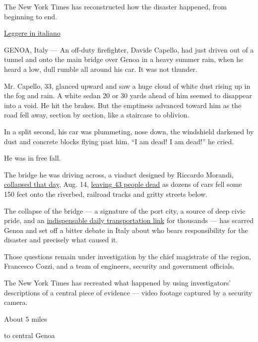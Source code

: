 The New York Times has reconstructed how the disaster happened, from
beginning to end.

\href{https://www.nytimes3xbfgragh.onion/interactive/2018/09/08/world/europe/genoa-italy-bridge-italian.html}{Leggere
in italiano}

GENOA, Italy --- An off-duty firefighter, Davide Capello, had just
driven out of a tunnel and onto the main bridge over Genoa in a heavy
summer rain, when he heard a low, dull rumble all around his car. It was
not thunder.

Mr. Capello, 33, glanced upward and saw a huge cloud of white dust
rising up in the fog and rain. A white sedan 20 or 30 yards ahead of him
seemed to disappear into a void. He hit the brakes. But the emptiness
advanced toward him as the road fell away, section by section, like a
staircase to oblivion.

In a split second, his car was plummeting, nose down, the windshield
darkened by dust and concrete blocks flying past him. ``I am dead! I am
dead!'' he cried.

He was in free fall.

The bridge he was driving across, a viaduct designed by Riccardo
Morandi,
\href{https://www.nytimes3xbfgragh.onion/2018/08/14/world/europe/italy-genoa-bridge-collapse.html}{collapsed
that day}, Aug. 14,
\href{https://www.nytimes3xbfgragh.onion/2018/08/18/world/europe/italy-genoa-morandi-bridge-funeral.html}{leaving
43 people dead} as dozens of cars fell some 150 feet onto the riverbed,
railroad tracks and gritty streets below.

The collapse of the bridge --- a signature of the port city, a source of
deep civic pride, and an
\href{https://www.nytimes3xbfgragh.onion/2018/08/16/world/europe/genoa-morandi-bridge-political-paralysis.html}{indispensable
daily transportation link} for thousands --- has scarred Genoa and set
off a bitter debate in Italy about who bears responsibility for the
disaster and precisely what caused it.

Those questions remain under investigation by the chief magistrate of
the region, Francesco Cozzi, and a team of engineers, security and
government officials.

The New York Times has recreated what happened by using investigators'
descriptions of a central piece of evidence --- video footage captured
by a security camera.

About 5 miles

to central Genoa

